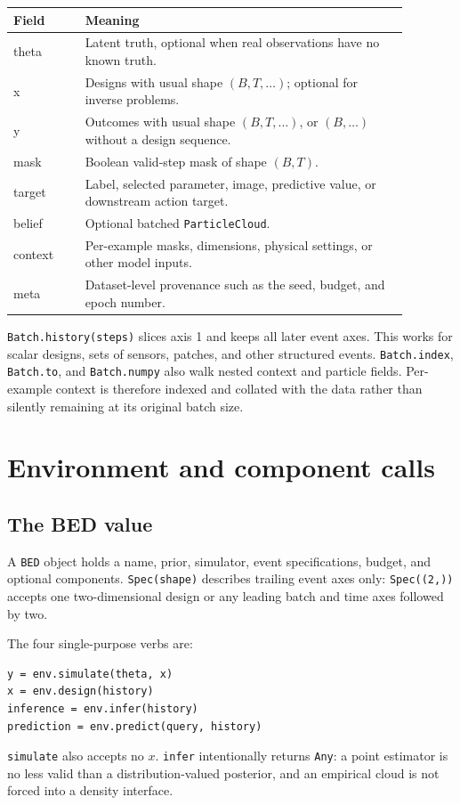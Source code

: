 \documentclass[11pt]{article}
\begin{document}
\begin{center}
\begin{tabular}{>{\ttfamily}p{0.16\linewidth}p{0.72\linewidth}}
\toprule
Field & Meaning \\
\midrule
theta & Latent truth, optional when real observations have no known truth. \\
x & Designs with usual shape $(B,T,\ldots)$; optional for inverse problems. \\
y & Outcomes with usual shape $(B,T,\ldots)$, or $(B,\ldots)$ without a design sequence. \\
mask & Boolean valid-step mask of shape $(B,T)$. \\
target & Label, selected parameter, image, predictive value, or downstream action target. \\
belief & Optional batched \texttt{ParticleCloud}. \\
context & Per-example masks, dimensions, physical settings, or other model inputs. \\
meta & Dataset-level provenance such as the seed, budget, and epoch number. \\
\bottomrule
\end{tabular}
\end{center}

\texttt{Batch.history(steps)} slices axis 1 and keeps all later event axes. This
works for scalar designs, sets of sensors, patches, and other structured events.
\texttt{Batch.index}, \texttt{Batch.to}, and \texttt{Batch.numpy} also walk
nested context and particle fields. Per-example context is therefore indexed and
collated with the data rather than silently remaining at its original batch size.

\section{Environment and component calls}

\subsection{The BED value}

A \texttt{BED} object holds a name, prior, simulator, event specifications, budget,
and optional components. \texttt{Spec(shape)} describes trailing event axes only:
\texttt{Spec((2,))} accepts one two-dimensional design or any leading batch and
time axes followed by two.

The four single-purpose verbs are:
\begin{lstlisting}
y = env.simulate(theta, x)
x = env.design(history)
inference = env.infer(history)
prediction = env.predict(query, history)
\end{lstlisting}
\texttt{simulate} also accepts no $x$. \texttt{infer} intentionally returns
\texttt{Any}: a point estimator is no less valid than a distribution-valued
posterior, and an empirical cloud is not forced into a density interface.
\end{document}
